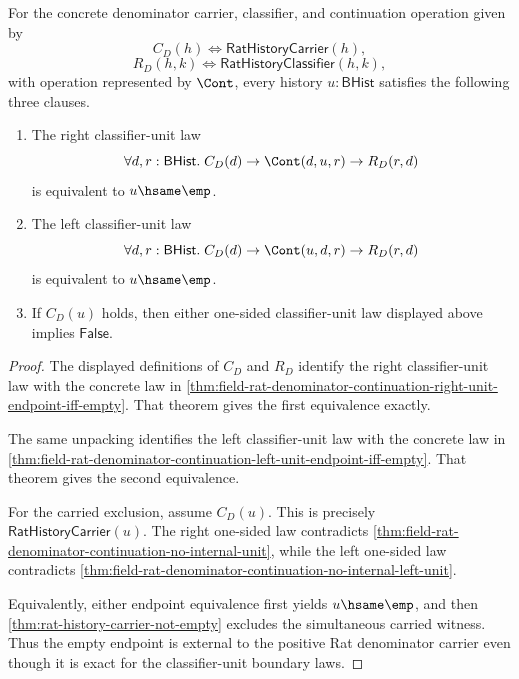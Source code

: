\begin{theorem}
\label{thm:field-rat-denominator-external-unit-separation-package}
For the concrete denominator carrier, classifier, and continuation operation
given by
$$
C_D(h)\Longleftrightarrow\mathsf{RatHistoryCarrier}(h),
$$
$$
R_D(h,k)\Longleftrightarrow\mathsf{RatHistoryClassifier}(h,k),
$$
with operation represented by $\Cont$, every history $u:\mathsf{BHist}$
satisfies the following three clauses.
\begin{enumerate}
\item The right classifier-unit law
$$
\forall d,r:\mathsf{BHist}.\;
C_D(d)\to
\Cont(d,u,r)\to
R_D(r,d)
$$
is equivalent to $u\hsame\emp$.
\item The left classifier-unit law
$$
\forall d,r:\mathsf{BHist}.\;
C_D(d)\to
\Cont(u,d,r)\to
R_D(r,d)
$$
is equivalent to $u\hsame\emp$.
\item If $C_D(u)$ holds, then either one-sided classifier-unit law displayed
above implies $\mathsf{False}$.
\end{enumerate}
\end{theorem}
\begin{proof}
The displayed definitions of $C_D$ and $R_D$ identify the right classifier-unit
law with the concrete law in
\autoref{thm:field-rat-denominator-continuation-right-unit-endpoint-iff-empty}.
That theorem gives the first equivalence exactly.

The same unpacking identifies the left classifier-unit law with the concrete
law in
\autoref{thm:field-rat-denominator-continuation-left-unit-endpoint-iff-empty}.
That theorem gives the second equivalence.

For the carried exclusion, assume $C_D(u)$. This is precisely
$\mathsf{RatHistoryCarrier}(u)$. The right one-sided law contradicts
\autoref{thm:field-rat-denominator-continuation-no-internal-unit}, while the
left one-sided law contradicts
\autoref{thm:field-rat-denominator-continuation-no-internal-left-unit}.

Equivalently, either endpoint equivalence first yields $u\hsame\emp$, and then
\autoref{thm:rat-history-carrier-not-empty} excludes the simultaneous carried
witness. Thus the empty endpoint is external to the positive Rat denominator
carrier even though it is exact for the classifier-unit boundary laws.
\end{proof}

